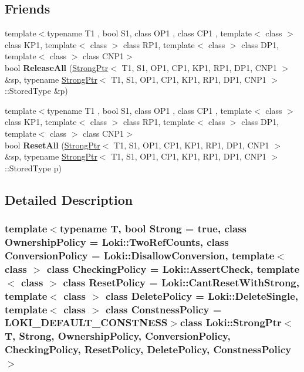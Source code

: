 \subsection*{Friends}
\begin{DoxyCompactItemize}
\item 
\hypertarget{classLoki_1_1StrongPtr_a4c301fdd2a81a670058a968f00eca836}{}{\footnotesize template$<$typename T1 , bool S1, class O\+P1 , class C\+P1 , template$<$ class $>$ class K\+P1, template$<$ class $>$ class R\+P1, template$<$ class $>$ class D\+P1, template$<$ class $>$ class C\+N\+P1$>$ }\\bool {\bfseries Release\+All} (\hyperlink{classLoki_1_1StrongPtr}{Strong\+Ptr}$<$ T1, S1, O\+P1, C\+P1, K\+P1, R\+P1, D\+P1, C\+N\+P1 $>$ \&sp, typename \hyperlink{classLoki_1_1StrongPtr}{Strong\+Ptr}$<$ T1, S1, O\+P1, C\+P1, K\+P1, R\+P1, D\+P1, C\+N\+P1 $>$\+::Stored\+Type \&p)\label{classLoki_1_1StrongPtr_a4c301fdd2a81a670058a968f00eca836}

\item 
\hypertarget{classLoki_1_1StrongPtr_ae5e318989cbd7dd7ea697f36c96faef2}{}{\footnotesize template$<$typename T1 , bool S1, class O\+P1 , class C\+P1 , template$<$ class $>$ class K\+P1, template$<$ class $>$ class R\+P1, template$<$ class $>$ class D\+P1, template$<$ class $>$ class C\+N\+P1$>$ }\\bool {\bfseries Reset\+All} (\hyperlink{classLoki_1_1StrongPtr}{Strong\+Ptr}$<$ T1, S1, O\+P1, C\+P1, K\+P1, R\+P1, D\+P1, C\+N\+P1 $>$ \&sp, typename \hyperlink{classLoki_1_1StrongPtr}{Strong\+Ptr}$<$ T1, S1, O\+P1, C\+P1, K\+P1, R\+P1, D\+P1, C\+N\+P1 $>$\+::Stored\+Type p)\label{classLoki_1_1StrongPtr_ae5e318989cbd7dd7ea697f36c96faef2}

\end{DoxyCompactItemize}


\subsection{Detailed Description}
\subsubsection*{template$<$typename T, bool Strong = true, class Ownership\+Policy = Loki\+::\+Two\+Ref\+Counts, class Conversion\+Policy = Loki\+::\+Disallow\+Conversion, template$<$ class $>$ class Checking\+Policy = Loki\+::\+Assert\+Check, template$<$ class $>$ class Reset\+Policy = Loki\+::\+Cant\+Reset\+With\+Strong, template$<$ class $>$ class Delete\+Policy = Loki\+::\+Delete\+Single, template$<$ class $>$ class Constness\+Policy = L\+O\+K\+I\+\_\+\+D\+E\+F\+A\+U\+L\+T\+\_\+\+C\+O\+N\+S\+T\+N\+E\+S\+S$>$class Loki\+::\+Strong\+Ptr$<$ T, Strong, Ownership\+Policy, Conversion\+Policy, Checking\+Policy, Reset\+Policy, Delete\+Policy, Constness\+Policy $>$}


